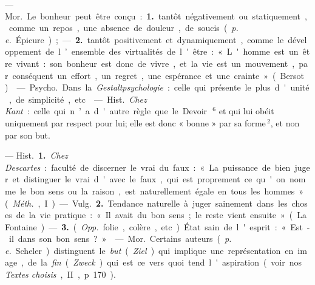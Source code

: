 \begin{itemize}[leftmargin=1cm, label=, itemsep=1pt]
 — \si{Mor.} Le bonheur peut
être conçu : {\bf 1.} tantôt négativement
ou statiquement, comme un repos,
une absence de douleur, de soucis
({\it p. e.} Épicure); — {\bf 2.} tantôt positivement et dynamiquement, comme le
développement de l’ensemble des
virtualités de l'être : « L'homme est
un être vivant : son bonheur est
donc de vivre, et la vie est un mouvement, par conséquent un effort,
un regret, une espérance et une
crainte » (Bersot).

 — \si{Psycho.} Dans la
{\it Gestaltpsychologie} : celle qui présente
le plus d'unité, de simplicité, etc.

 — \si{Hist.} {\it Chez Kant} :
celle qui n’a d'autre règle que le
Devoir\,$^6$ et qui lui obéit uniquement
par respect pour lui; elle est donc
« bonne » par sa forme\,$^2$, et non par
son but.

 — \si{Hist.} {\bf 1.} {\it Chez Descartes} :
faculté de discerner le vrai du faux :
« La puissance de bien juger et distinguer le vrai d'avec le faux, qui
est proprement ce qu'on nomme le
bon sens ou la raison, est naturellement égale en tous les hommes »
({\it Méth.}, I).

— \si{Vulg.} {\bf 2.} Tendance naturelle à
juger sainement dans les choses de
la vie pratique : « Il avait du bon
sens; le reste vient ensuite » (La
Fontaine). — {\bf 3.} ({\it Opp.} folie, colère,
etc.). État sain de l'esprit : « Est-il
dans son bon sens ? »

 — \si{Mor.} Certains auteurs ({\it p. e.}
Scheler) distinguent le {\it but} ({\it Ziel}) qui
implique une représentation en
image, de la {\it fin} ({\it Zweck}) qui est ce
vers quoi tend l'aspiration (voir nos
{\it Textes choisis}, II, p. 170).

	\end{itemize}
